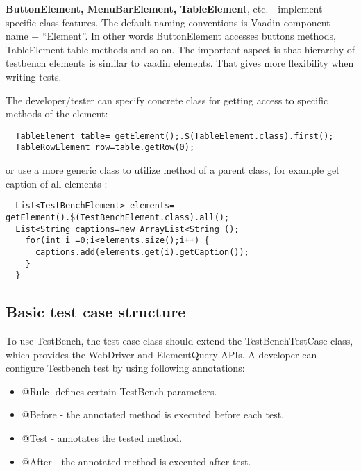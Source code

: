 \textbf{ButtonElement, MenuBarElement, TableElement}, etc. - implement specific
class features. The default naming conventions is Vaadin component name + ``Element''.
In other words ButtonElement accesses buttons methods, TableElement table methods and so on.
The important aspect is that hierarchy of testbench elements is similar to vaadin elements.
That gives more flexibility when writing tests.

The  developer/tester can specify concrete class for getting access to specific methods of the element:
 
 \lstset{language=Java}
  \begin{lstlisting}
  TableElement table= getElement();.$(TableElement.class).first();
  TableRowElement row=table.getRow(0);
 \end{lstlisting}
 
or use a more generic class to utilize method of a parent class, for example get caption of all elements :

  \lstset{language=Java}
  \begin{lstlisting}
  List<TestBenchElement> elements= getElement().$(TestBenchElement.class).all();
  List<String captions=new ArrayList<String ();
    for(int i =0;i<elements.size();i++) {
      captions.add(elements.get(i).getCaption());
    }
  }
  \end{lstlisting}

\subsection {Basic test case structure}
To use TestBench, the test case class should extend the TestBenchTestCase class,
which provides the WebDriver and ElementQuery APIs. A developer
can configure Testbench test by using following annotations:
\begin{itemize}
  \item @Rule -defines certain TestBench parameters.
  \item @Before - the annotated method is executed before each test.
  \item @Test - annotates the tested method.
  \item @After - the annotated method is executed after test.
\end{itemize}

